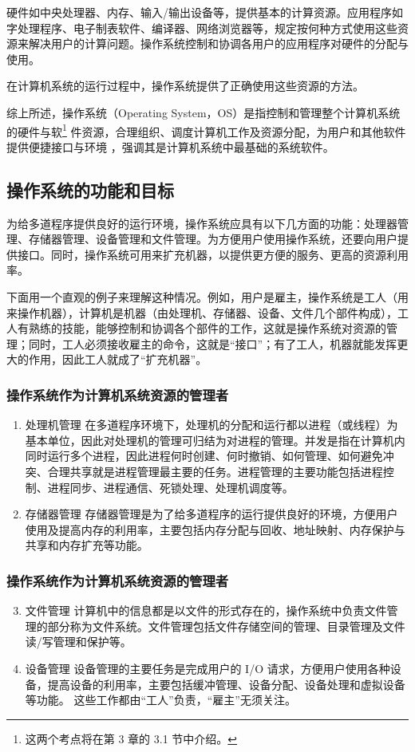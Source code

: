 \documentclass{ctexbook}
\begin{document}
	硬件如中央处理器、内存、输入/输出设备等，提供基本的计算资源。应用程序如字处理程序、电子制表软件、编译器、网络浏览器等，规定按何种方式使用这些资源来解决用户的计算问题。操作系统控制和协调各用户的应用程序对硬件的分配与使用。
	
	在计算机系统的运行过程中，操作系统提供了正确使用这些资源的方法。
	
	综上所述，操作系统（Operating System，OS）是指控制和管理整个计算机系统的硬件与软\footnote{这两个考点将在第 3 章的 3.1 节中介绍。}
	件资源，合理组织、调度计算机工作及资源分配，为用户和其他软件提供便捷接口与环境 ，强调其是计算机系统中最基础的系统软件。
	\subsection{操作系统的功能和目标}
	为给多道程序提供良好的运行环境，操作系统应具有以下几方面的功能：处理器管理、存储器管理、设备管理和文件管理。为方便用户使用操作系统，还要向用户提供接口。同时，操作系统可用来扩充机器，以提供更方便的服务、更高的资源利用率。
	
	下面用一个直观的例子来理解这种情况。例如，用户是雇主，操作系统是工人（用来操作机器），计算机是机器（由处理机、存储器、设备、文件几个部件构成），工人有熟练的技能，能够控制和协调各个部件的工作，这就是操作系统对资源的管理；同时，工人必须接收雇主的命令，这就是“接口”；有了工人，机器就能发挥更大的作用，因此工人就成了“扩充机器”。
	
	\subsubsection{操作系统作为计算机系统资源的管理者}
	\begin{enumerate}
		\item 处理机管理
		在多道程序环境下，处理机的分配和运行都以进程（或线程）为基本单位，因此对处理机的管理可归结为对进程的管理。并发是指在计算机内同时运行多个进程，因此进程何时创建、何时撤销、如何管理、如何避免冲突、合理共享就是进程管理最主要的任务。进程管理的主要功能包括进程控制、进程同步、进程通信、死锁处理、处理机调度等。
		\item 存储器管理
		存储器管理是为了给多道程序的运行提供良好的环境，方便用户使用及提高内存的利用率，主要包括内存分配与回收、地址映射、内存保护与共享和内存扩充等功能。
	\end{enumerate}
	
	\subsubsection{操作系统作为计算机系统资源的管理者}
	\begin{enumerate}
		\setcounter{enumi}{2}
		\item 文件管理
		计算机中的信息都是以文件的形式存在的，操作系统中负责文件管理的部分称为文件系统。文件管理包括文件存储空间的管理、目录管理及文件读/写管理和保护等。
		\item 设备管理
		设备管理的主要任务是完成用户的 I/O 请求，方便用户使用各种设备，提高设备的利用率，主要包括缓冲管理、设备分配、设备处理和虚拟设备等功能。
		这些工作都由“工人”负责，“雇主”无须关注。
	\end{enumerate}
	
\end{document}
